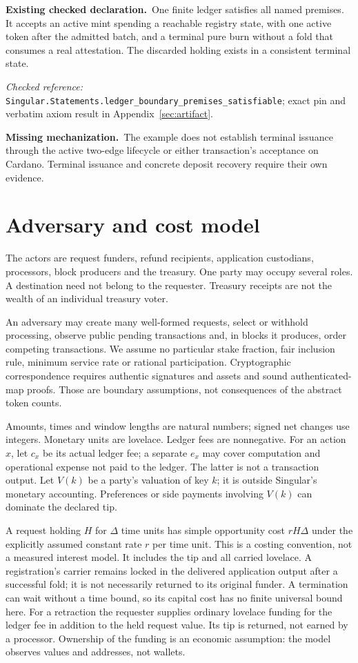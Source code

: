 \documentclass[runningheads]{llncs}
\newcommand{\checked}{\par\noindent\textcolor{green!35!black}{\textbf{Existing checked declaration.}}\ }
\newcommand{\missing}{\par\noindent\textcolor{red!65!black}{\textbf{Missing mechanization.}}\ }
\newcommand{\decl}[1]{\textnormal{\small\nolinkurl{#1}}}
\newcommand{\evidence}[1]{\par\noindent\textit{Checked reference:} \decl{Singular.Statements.#1}; exact pin and verbatim axiom result in Appendix~\ref{sec:artifact}.\par}
\begin{document}
\checked One finite ledger satisfies all named premises. It accepts an active
mint spending a reachable registry state, with one active token after the
admitted batch, and a terminal pure burn without a fold that consumes a real
attestation. The discarded holding exists in a consistent terminal state.
\evidence{ledger_boundary_premises_satisfiable}
\missing The example does not establish terminal issuance through the active
two-edge lifecycle or either transaction's acceptance on Cardano. Terminal
issuance and concrete deposit recovery require their own evidence.

\section{Adversary and cost model}
The actors are request funders, refund recipients, application custodians,
processors, block producers and the treasury. One party may occupy several
roles. A destination need not belong to the requester. Treasury receipts are
not the wealth of an individual treasury voter.

An adversary may create many well-formed requests, select or withhold processing,
observe public pending transactions and, in blocks it produces, order competing
transactions. We assume no particular stake fraction, fair inclusion rule,
minimum service rate or rational participation. Cryptographic correspondence
requires authentic signatures and assets and sound authenticated-map proofs.
Those are boundary assumptions, not consequences of the abstract token counts.

Amounts, times and window lengths are natural numbers; signed net changes use
integers. Monetary units are lovelace. Ledger fees are nonnegative.
For an action $x$, let $c_x$ be its actual ledger fee; a separate $e_x$ may cover
computation and operational expense not paid to the ledger. The latter is not a
transaction output. Let $V(k)$ be a party's valuation of key $k$; it is outside
Singular's monetary accounting. Preferences or side payments involving $V(k)$
can dominate the declared tip.

A request holding $H$ for $\Delta$ time units has simple opportunity cost
$rH\Delta$ under the explicitly assumed constant rate $r$ per time unit.
This is a costing convention, not a measured interest model. It includes the
tip and all carried lovelace. A registration's carrier remains locked in the
delivered application output after a successful fold; it is not necessarily
returned to its original funder. A termination can wait without a time bound,
so its capital cost has no finite universal bound here.
For a retraction the requester supplies ordinary lovelace funding for the
ledger fee in addition to the held request value. Its tip is returned, not
earned by a processor. Ownership of the funding is an economic assumption:
the model observes values and addresses, not wallets.
\end{document}
